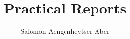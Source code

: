 \documentclass{report}
\title{Practical Reports}
\author{Salomon Aengenheytser-Aber}
\begin{document}
  \nocite{*}

  \maketitle
 
  \tableofcontents
  
  
  
  
  
  
  
  
  
  \newpage
  
  
  
\end{document}
